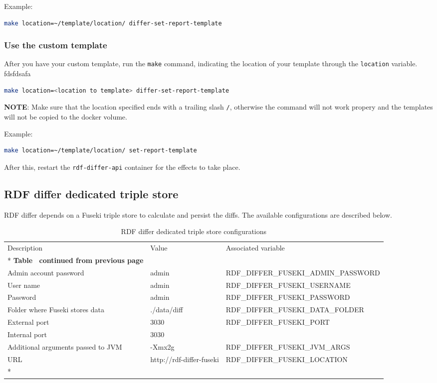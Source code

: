 		Example:
		\begin{lstlisting}[language=bash]
make location=~/template/location/ differ-set-report-template
		\end{lstlisting}
		 
		\subsubsection{Use the custom template}
		After you have your custom template, run the \texttt{make} command, indicating the location of your template through the \texttt{location} variable. fdsfdsafa
		\begin{lstlisting}[language=bash]
make location=<location to template> differ-set-report-template
		\end{lstlisting}

		\textbf{NOTE}: Make sure that the location specified ends with a trailing slash \texttt{/}, otherwise the command will not work propery and the templates will not be copied to the docker volume.

		Example:
		\begin{lstlisting}[language=bash]
make location=~/template/location/ set-report-template
		\end{lstlisting}

		After this, restart the \texttt{rdf-differ-api} container for the effects to take place.

	
	\subsection{RDF differ dedicated triple store}
	
	RDF differ depends on a Fuseki triple store to calculate and persist the diffs. The available configurations are described below. 

	\begin{longtable}[c]{@{}p{4cm}p{2cm}l@{}}
		\toprule
		Description & Value & Associated variable \\* \midrule
		\endfirsthead
		\multicolumn{3}{c}%
		{{\bfseries Table \thetable\ continued from previous page}} \\
		\endhead
		\bottomrule
		\endfoot
		\endlastfoot
		Admin account password & admin & RDF\_DIFFER\_FUSEKI\_ADMIN\_PASSWORD \\
		User name & admin & RDF\_DIFFER\_FUSEKI\_USERNAME \\
		Password & admin & RDF\_DIFFER\_FUSEKI\_PASSWORD \\
		Folder where Fuseki stores data & ./data/diff & RDF\_DIFFER\_FUSEKI\_DATA\_FOLDER \\
		External port & 3030 & RDF\_DIFFER\_FUSEKI\_PORT \\
		Internal port & 3030 &  \\
		Additional arguments passed to JVM & -Xmx2g & RDF\_DIFFER\_FUSEKI\_JVM\_ARGS \\
		URL & http://rdf-differ-fuseki & RDF\_DIFFER\_FUSEKI\_LOCATION \\* \bottomrule
		\caption{RDF differ dedicated triple store configurations}
		\label{tab:my-table2}\\
	\end{longtable}
	
